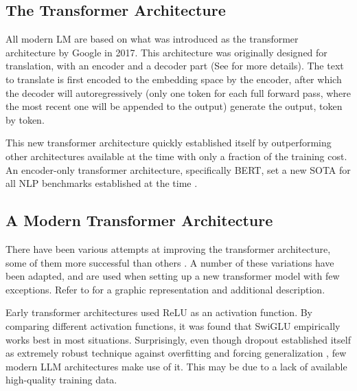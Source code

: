 \subsection{The Transformer Architecture}\label{sub:transformer}
All modern \acrlong{LM} are based on what was introduced as the transformer architecture \cite{vaswani_attention_2017} by \gls{Google} in 2017.
This architecture was originally designed for translation, with an encoder and a decoder part (See  for more details).
The text to translate is first encoded to the embedding space by the encoder, after which the decoder will autoregressively (only one token for each full forward pass, where the most recent one will be appended to the output) generate the output, token by token.

This new transformer architecture quickly established itself by outperforming other architectures available at the time with only a fraction of the training cost.
An encoder-only transformer architecture, specifically \gls{BERT}, set a new \gls{SOTA} for all \gls{NLP} benchmarks established at the time \cite{devlin_bert_2018}.





\subsection{A Modern Transformer Architecture}\label{sub:modern}

There have been various attempts at improving the transformer architecture, some of them more successful than others \cite{shazeer_glu_2020, su_roformer_2022, ainslie_gqa_2023, bolya_hydra_2022, sukhbaatar_adaptive_2019, lu_understanding_2019, ye_understanding_2023, wu_memorizing_2022}.
A number of these variations have been adapted, and are used when setting up a new transformer model with few exceptions.
Refer to  for a graphic representation and additional description.

Early transformer architectures used \gls{ReLU} as an activation function. By comparing different activation functions, it was found that \gls{SwiGLU} empirically works best in most situations. %
Surprisingly, even though dropout established itself as extremely robust technique against overfitting and forcing generalization  \cite{srivastava_dropout_2014}, few modern \gls{LLM} architectures make use of it.
This may be due to a lack of available high-quality training data.

